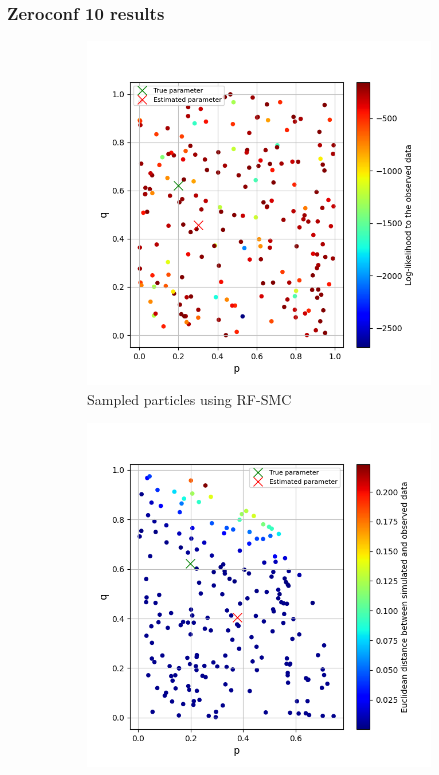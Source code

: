 \documentclass{beamer}
\begin{document}
\begin{frame}
    \frametitle{Zeroconf 10 results}
    \begin{figure}[H]
        \centering
        \begin{subfigure}{0.48\textwidth}
            \centering
            \includegraphics[width=\linewidth]{figures/zeroconf10_rf.png}
            \caption{Sampled particles using RF-SMC}
        \end{subfigure}
        \hfill
        \begin{subfigure}{0.48\textwidth}
            \centering
            \includegraphics[width=\linewidth]{figures/zeroconf10_sim.png}

\end{subfigure}
\end{figure}
\end{frame}
\end{document}
